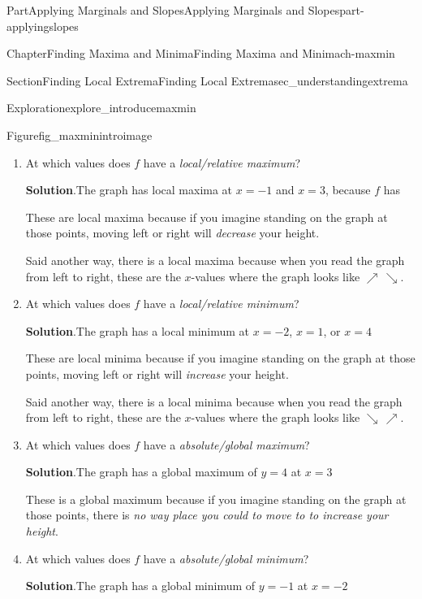 \documentclass{tufte-book}
\newcommand{\blocktitlefont}{\relax}
\numberwithin{equation}{chapter}
\begin{document}
\begin{partptx}{Part}{Applying Marginals and Slopes}{}{Applying Marginals and Slopes}{}{}{part-applyingslopes}
\begin{chapterptx}{Chapter}{Finding Maxima and Minima}{}{Finding Maxima and Minima}{}{}{ch-maxmin}
\begin{sectionptx}{Section}{Finding Local Extrema}{}{Finding Local Extrema}{}{}{sec_understandingextrema}
\begin{exploration}{Exploration}{}{explore_introducemaxmin}
\begin{figureptx}{Figure}{}{fig_maxminintroimage}{}
\begin{image}{0.125}{0.75}{0.125}{}
{\begin{tikzpicture}
\end{tikzpicture}
}%
\end{image}%
\tcblower
\end{figureptx}%
\begin{enumerate}[font=\bfseries,label=(\alph*),ref=\alph*]%
\item{}At which values does \(f\) have a \emph{local\slash{}relative maximum}?%
\par\smallskip%
\noindent\textbf{\blocktitlefont Solution}.\hypertarget{explore_introducemaxmin-2-2}{}\quad{}The graph has local maxima at \(x=-1\) and \(x=3\), because \(f\) has \emph{}%
\par
These are local maxima because if you imagine standing on the graph at those points, moving left or right will \emph{decrease} your height.%
\par
Said another way, there is a local maxima because when you read the graph from left to right, these are the \(x\)-values where the graph looks like \(\nearrow\, \searrow\).%
\item{}At which values does \(f\) have a \emph{local\slash{}relative minimum}?%
\par\smallskip%
\noindent\textbf{\blocktitlefont Solution}.\hypertarget{explore_introducemaxmin-3-2}{}\quad{}The graph has a local minimum at \(x=-2\), \(x=1\), or \(x=4\)%
\par
These are local minima because if you imagine standing on the graph at those points, moving left or right will \emph{increase} your height.%
\par
Said another way, there is a local minima because when you read the graph from left to right, these are the \(x\)-values where the graph looks like \(\searrow\, \nearrow\).%
\item{}At which values does \(f\) have a \emph{absolute\slash{}global maximum}?%
\par\smallskip%
\noindent\textbf{\blocktitlefont Solution}.\hypertarget{explore_introducemaxmin-4-2}{}\quad{}The graph has a global maximum of \(y=4\) at \(x=3\)%
\par
These is a global maximum because if you imagine standing on the graph at those points, there is \emph{no way place you could to move to to increase your height}.%
\item{}At which values does \(f\) have a \emph{absolute\slash{}global minimum}?%
\par\smallskip%
\noindent\textbf{\blocktitlefont Solution}.\hypertarget{explore_introducemaxmin-5-2}{}\quad{}The graph has a global minimum of \(y=-1\) at \(x=-2\)%

\end{enumerate}
\end{exploration}
\end{sectionptx}
\end{chapterptx}
\end{partptx}
\end{document}
